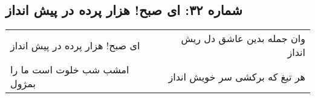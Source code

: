 \begin{center}
\section*{شماره ۳۲: ای صبح! هزار پرده در پیش انداز}
\label{sec:032}
\begin{longtable}{l p{0.5cm} r}
ای صبح! هزار پرده در پیش انداز
&&
وان جمله بدین عاشق دل ریش انداز
\\
امشب شب خلوت است ما را بمژول
&&
هر تیغ که برکشی سر خویش انداز
\\
\end{longtable}
\end{center}
